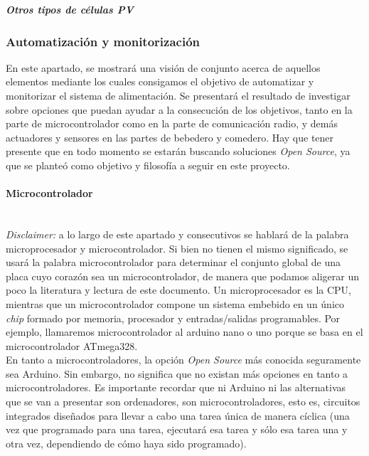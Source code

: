 \documentclass[12pt]{article}
\newcommand{\subsubsubsection}[1]{\paragraph{#1}\mbox{}\\}
\begin{document}
	\noindent \textit{\textbf{Otros tipos de células PV}} \\
	
	\subsubsection{Automatización y monitorización}
	\label{subsección 3.2.2: automatización y monitorización}
	
	\noindent En este apartado, se mostrará una visión de conjunto acerca de aquellos elementos mediante los cuales consigamos el objetivo de automatizar y monitorizar el sistema de alimentación. Se presentará el resultado de investigar sobre opciones que puedan ayudar a la consecución de los objetivos, tanto en la parte de microcontrolador como en la parte de comunicación radio, y demás actuadores y sensores en las partes de bebedero y comedero. Hay que tener presente que en todo momento se estarán buscando soluciones \textit{Open Source}, ya que se planteó como objetivo y filosofía a seguir en este proyecto.\\
	
	\subsubsubsection{Microcontrolador}
	
	\noindent \textit{Disclaimer:} a lo largo de este apartado y consecutivos se hablará de la palabra microprocesador y microcontrolador. Si bien no tienen el mismo significado, se usará la palabra microcontrolador para determinar el conjunto global de una placa cuyo corazón sea un microcontrolador, de manera que podamos aligerar un poco la literatura y lectura de este documento. Un microprocesador es la CPU, mientras que un microcontrolador compone un sistema embebido en un único \textit{chip} formado por memoria, procesador y entradas/salidas programables. Por ejemplo, llamaremos microcontrolador al arduino nano o uno porque se basa en el microcontrolador ATmega328.\\
	
	\noindent En tanto a microcontroladores, la opción \textit{Open Source} más conocida seguramente sea Arduino. Sin embargo, no significa que no existan más opciones en tanto a microcontroladores. Es importante recordar que ni Arduino ni las alternativas que se van a presentar son ordenadores, son microcontroladores, esto es, circuitos integrados diseñados para llevar a cabo una tarea única de manera cíclica (una vez que programado para una tarea, ejecutará esa tarea y sólo esa tarea una y otra vez, dependiendo de cómo haya sido programado).\\
	
\end{document}
